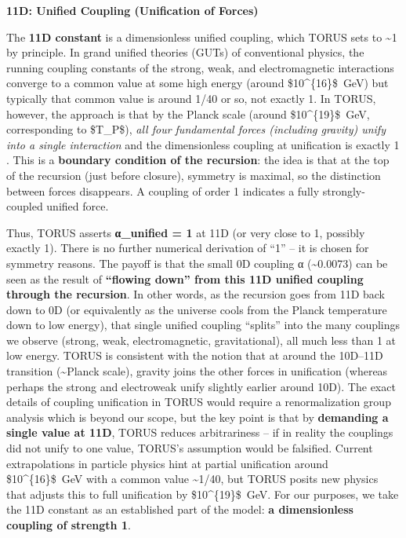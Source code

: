 \documentclass[]{article}
\begin{document}
\textbf{11D: Unified Coupling (Unification of Forces)}

The \textbf{11D constant} is a dimensionless unified coupling, which
TORUS sets to \textasciitilde{}1 by principle. In grand unified theories
(GUTs) of conventional physics, the running coupling constants of the
strong, weak, and electromagnetic interactions converge to a common
value at some high energy (around \$10\^{}\{16\}\$~GeV) but typically
that common value is around 1/40 or so, not exactly 1. In TORUS,
however, the approach is that by the Planck scale (around
\$10\^{}\{19\}\$~GeV, corresponding to \$T\_P\$), \emph{all four
fundamental forces (including gravity) unify into a single interaction}
and the dimensionless coupling at unification is exactly 1​. This is a
\textbf{boundary condition of the recursion}: the idea is that at the
top of the recursion (just before closure), symmetry is maximal, so the
distinction between forces disappears. A coupling of order 1 indicates a
fully strongly-coupled unified force.

Thus, TORUS asserts \textbf{α\_unified = 1} at 11D (or very close to 1,
possibly exactly 1). There is no further numerical derivation of ``1''
-- it is chosen for symmetry reasons. The payoff is that the small 0D
coupling α (\textasciitilde{}0.0073) can be seen as the result of
\textbf{``flowing down'' from this 11D unified coupling through the
recursion}. In other words, as the recursion goes from 11D back down to
0D (or equivalently as the universe cools from the Planck temperature
down to low energy), that single unified coupling ``splits'' into the
many couplings we observe (strong, weak, electromagnetic,
gravitational), all much less than 1 at low energy​. TORUS is consistent
with the notion that at around the 10D--11D transition
(\textasciitilde{}Planck scale), gravity joins the other forces in
unification (whereas perhaps the strong and electroweak unify slightly
earlier around 10D)​. The exact details of coupling unification in TORUS
would require a renormalization group analysis which is beyond our
scope, but the key point is that by \textbf{demanding a single value at
11D}, TORUS reduces arbitrariness -- if in reality the couplings did not
unify to one value, TORUS's assumption would be falsified​. Current
extrapolations in particle physics hint at partial unification around
\$10\^{}\{16\}\$~GeV with a common value \textasciitilde{}1/40, but
TORUS posits new physics that adjusts this to full unification by
\$10\^{}\{19\}\$~GeV​. For our purposes, we take the 11D constant as an
established part of the model: \textbf{a dimensionless coupling of
strength 1}.
\end{document}
